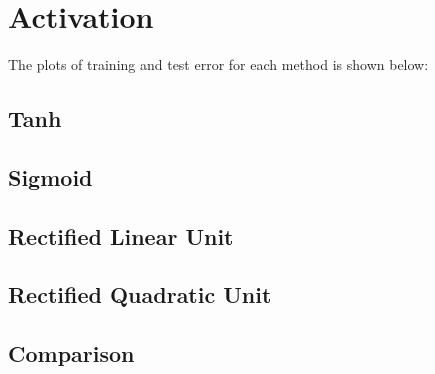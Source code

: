 \documentclass[twoside,12pt]{article}
\begin{document}
\section{Activation}
The plots of training and test error for each method is shown below:
\subsection{Tanh}
\subsection{Sigmoid}
\subsection{Rectified Linear Unit}
\subsection{Rectified Quadratic Unit}
\subsection{Comparison}
\end{document}
